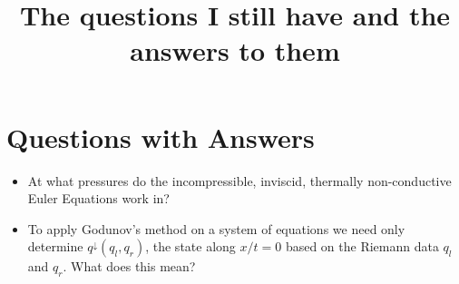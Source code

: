\documentclass[]{article}
\title{The questions I still have and the answers to them}
\author{}
\begin{document}
\maketitle

\begin{abstract}

\end{abstract}

\section{Questions with Answers}

	\begin{itemize}
		\item At what pressures do the incompressible, inviscid, thermally non-conductive Euler Equations work in?
		
		\item To apply Godunov's method on a system of equations we need only determine $ q^\downarrow(q_l, q_r)$, the state along $ x/t = 0 $ based on the Riemann data $ q_l $ and $ q_r $. What does this mean?
	\end{itemize}
\end{document}
